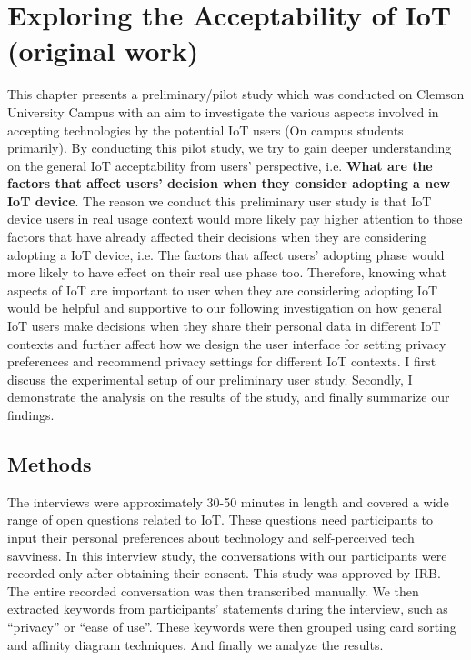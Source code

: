 
\chapter{Exploring the Acceptability of IoT (original work)}\label{chapter:acceptability}

This chapter presents a preliminary/pilot study which was conducted on Clemson University Campus with an aim to investigate the various aspects involved in accepting technologies by the potential IoT users (On campus students primarily). By conducting this pilot study, we try to gain deeper understanding on the general IoT acceptability from users' perspective, i.e. \textbf{What are the factors that affect users' decision when they consider adopting a new IoT device}. The reason we conduct this preliminary user study is that IoT device users in real usage context would more likely pay higher attention to those factors that have already affected their decisions when they are considering adopting a IoT device, i.e. The factors that affect users' adopting phase would more likely to have effect on their real use phase too. Therefore, knowing what aspects of IoT are important to user when they are considering adopting IoT would be helpful and supportive to our following investigation on how general IoT users make decisions when they share their personal data in different IoT contexts and further affect how we design the user interface for setting privacy preferences and recommend privacy settings for different IoT contexts. I first discuss the experimental setup of our preliminary user study. Secondly, I demonstrate the analysis on the results of the study, and finally summarize our findings.

\section{Methods}
The interviews were approximately 30-50 minutes in length and covered a wide range of open questions related to IoT. These questions need participants to input their personal preferences about technology and self-perceived tech savviness. In this interview study, the conversations with our participants were recorded only after obtaining their consent. This study was approved by IRB. The entire recorded conversation was then transcribed manually. We then extracted keywords from participants' statements during the interview, such as ``privacy'' or ``ease of use''. These keywords were then grouped using card sorting and affinity diagram techniques. And finally we analyze the results.


